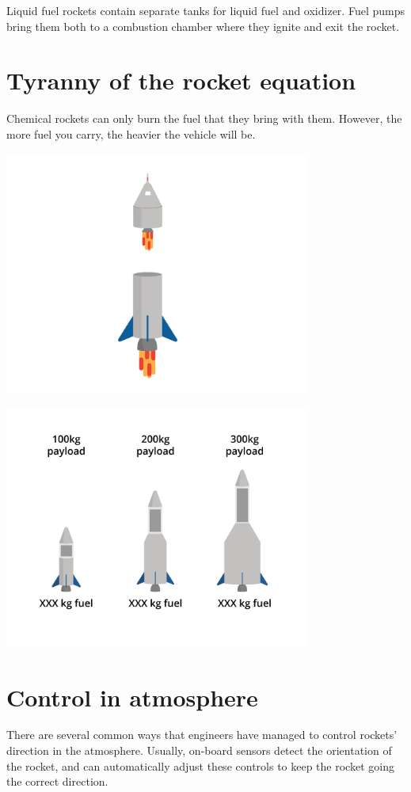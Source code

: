 Liquid fuel rockets contain separate tanks for liquid fuel and oxidizer. Fuel pumps bring them both to a combustion chamber where they ignite and exit the rocket.


\section{Tyranny of the rocket equation}
	Chemical rockets can only burn the fuel that they bring with them. However, the more fuel you carry, the heavier the vehicle will be. 

		\includegraphics[width=0.75\textwidth]{staging.png}


		\includegraphics[width=0.75\textwidth]{rocketFuelWeight.png}


\section{Control in atmosphere}

There are several common ways that engineers have managed to control rockets' direction in the atmosphere. Usually, on-board sensors detect the orientation of the rocket, and can automatically adjust these controls to keep the rocket going the correct direction.

